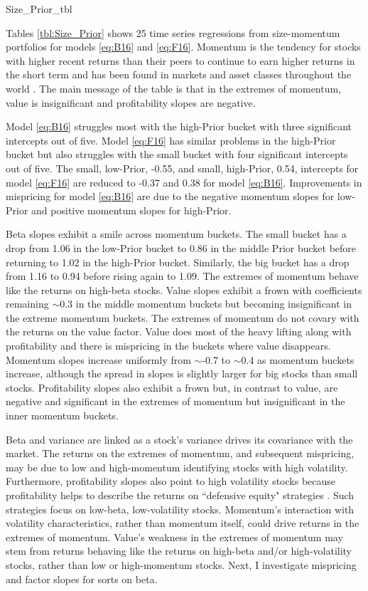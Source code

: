 
{Size_Prior_tbl}

Tables \ref{tbl:Size_Prior} shows 25 time series regressions from size-momentum
portfolios for models \ref{eq:B16} and \ref{eq:F16}.
Momentum is the tendency for stocks with higher recent returns than
their peers to continue to earn higher returns in the short term
\parencite{jegadeesh1993returns} and has been found in markets and
asset classes throughout the world \parencite{asness2013value}.
The main message of the table is that in the extremes of momentum,
value is insignificant and profitability slopes are negative.

Model \ref{eq:B16} struggles most with the high-Prior bucket with three
significant intercepts out of five.
Model \ref{eq:F16} has similar problems in the high-Prior bucket but also
struggles with the small bucket with four significant intercepts out of five.
The small, low-Prior, -0.55, and small, high-Prior, 0.54, intercepts for
model \ref{eq:F16} are reduced to -0.37 and 0.38 for model \ref{eq:B16}.
Improvements in mispricing for model \ref{eq:B16} are due to
the negative momentum slopes for low-Prior and positive momentum slopes for
high-Prior.

Beta slopes exhibit a smile across momentum buckets.
The small bucket has a drop from 1.06 in the low-Prior bucket to 0.86 in the
middle Prior bucket before returning to 1.02 in the high-Prior bucket.
Similarly, the big bucket has a drop from 1.16 to 0.94 before rising again to 1.09.
The extremes of momentum behave like the returns on high-beta stocks.
Value slopes exhibit a frown with coefficients remaining $\sim$0.3 in the
middle momentum buckets but becoming insignificant in the extreme momentum
buckets.
The extremes of momentum do not covary with the returns on the value factor.
Value does most of the heavy lifting along with profitability and
there is mispricing in the buckets where value disappears.
Momentum slopes increase uniformly from $\sim$-0.7 to $\sim$0.4 as momentum
buckets increase, although the spread in slopes is slightly larger for big
stocks than small stocks.
Profitability slopes also exhibit a frown but, in contrast to value, are
negative and significant in the extremes of momentum but insignificant
in the inner momentum buckets.

Beta and variance are linked as a stock's variance drives its covariance with
the market.
The returns on the extremes of momentum, and subsequent mispricing, may be due
to low and high-momentum identifying stocks with high volatility.
Furthermore, profitability slopes also point to high volatility stocks
because profitability helps to describe the returns on ``defensive equity"
strategies \parencite{novy2014understanding}.
Such strategies focus on low-beta, low-volatility stocks.
Momentum's interaction with volatility characteristics, rather than momentum
itself, could drive returns in the extremes of momentum.
Value's weakness in the extremes of momentum may stem from returns
behaving like the returns on high-beta and/or high-volatility stocks,
rather than low or high-momentum stocks.
Next, I investigate mispricing and factor slopes for sorts on beta.
